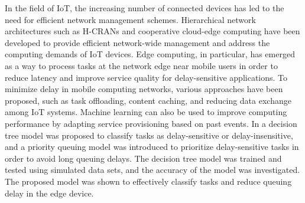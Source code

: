 In the field of IoT, the increasing number of connected devices has led to the need for efficient network management schemes. Hierarchical network architectures such as H-CRANs and cooperative cloud-edge computing have been developed to provide efficient network-wide management and address the computing demands of IoT devices. Edge computing, in particular, has emerged as a way to process tasks at the network edge near mobile users in order to reduce latency and improve service quality for delay-sensitive applications. To minimize delay in mobile computing networks, various approaches have been proposed, such as task offloading, content caching, and reducing data exchange among IoT systems. Machine learning can also be used to improve computing performance by adapting service provisioning based on past events. In \cite{DelaySensitiveIoT} a decision tree model was proposed to classify tasks as delay-sensitive or delay-insensitive, and a priority queuing model was introduced to prioritize delay-sensitive tasks in order to avoid long queuing delays. The decision tree model was trained and tested using simulated data sets, and the accuracy of the model was investigated. The proposed model was shown to effectively classify tasks and reduce queuing delay in the edge device.
